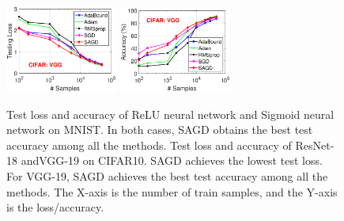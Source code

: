\documentclass[11pt]{article}
\begin{document}
\begin{figure}[t]
{\includegraphics[width=1.45in]{fig2/CIFAR_VGG_loss.eps}
\hspace{-0.15in}
\includegraphics[width=1.45in]{fig2/CIFAR_VGG_acc.eps}
}
 \caption[]{ Test loss and accuracy of ReLU neural network and Sigmoid neural network on MNIST. In both cases, \textsc{SAGD} obtains the best test accuracy among all the methods. Test loss and accuracy of ResNet-18 andVGG-19 on CIFAR10. \textsc{SAGD} achieves the lowest test loss. For VGG-19, \textsc{SAGD} achieves the best test accuracy among all the methods. 
The X-axis is the number of train samples, and the Y-axis is the loss/accuracy.} 
 \label{fig:mnist}
\end{figure}



\end{document}
